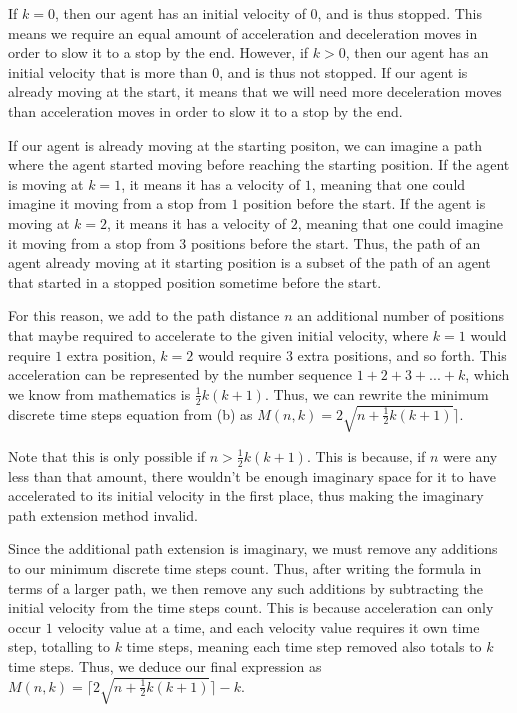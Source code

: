 \documentclass{article}
\begin{document}
If $k = 0$, then our agent has an initial velocity of $0$, and is thus stopped. This means we require an equal amount of acceleration and deceleration moves in order to slow it to a stop by the end. However, if $k > 0$, then our agent has an initial velocity that is more than $0$, and is thus not stopped. If our agent is already moving at the start, it means that we will need more deceleration moves than acceleration moves in order to slow it to a stop by the end.

If our agent is already moving at the starting positon, we can imagine a path where the agent started moving before reaching the starting position. If the agent is moving at $k = 1$, it means it has a velocity of $1$, meaning that one could imagine it moving from a stop from $1$ position before the start. If the agent is moving at $k = 2$, it means it has a velocity of $2$, meaning that one could imagine it moving from a stop from $3$ positions before the start. Thus, the path of an agent already moving at it starting position is a subset of the path of an agent that started in a stopped position sometime before the start.

For this reason, we add to the path distance $n$ an additional number of positions that maybe required to accelerate to the given initial velocity, where $k = 1$ would require $1$ extra position, $k = 2$ would require $3$ extra positions, and so forth. This acceleration can be represented by the number sequence $1 + 2 + 3 + ... + k$, which we know from mathematics is $\frac{1}{2} k (k + 1)$. Thus, we can rewrite the minimum discrete time steps equation from (b) as $M(n, k) = 2\sqrt{n + \frac{1}{2} k (k + 1)} \rceil$.

Note that this is only possible if $n > \frac{1}{2} k (k + 1)$. This is because, if $n$ were any less than that amount, there wouldn't be enough imaginary space for it to have accelerated to its initial velocity in the first place, thus making the imaginary path extension method invalid. 

Since the additional path extension is imaginary, we must remove any additions to our minimum discrete time steps count. Thus, after writing the formula in terms of a larger path, we then remove any such additions by subtracting the initial velocity from the time steps count. This is because acceleration can only occur $1$ velocity value at a time, and each velocity value requires it own time step, totalling to $k$ time steps, meaning each time step removed also totals to $k$ time steps. Thus, we deduce our final expression as $M(n, k) = \lceil 2\sqrt{n + \frac{1}{2} k (k + 1)} \rceil - k$.
\end{document}
